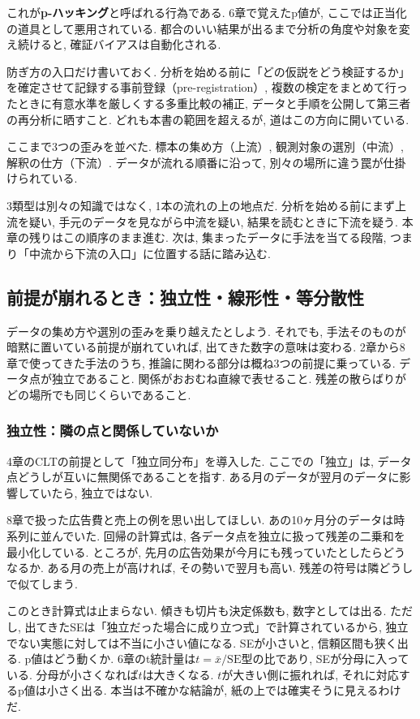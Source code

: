 これが\textbf{p-ハッキング}と呼ばれる行為である.
6章で覚えたp値が, ここでは正当化の道具として悪用されている.
都合のいい結果が出るまで分析の角度や対象を変え続けると, 確証バイアスは自動化される.

防ぎ方の入口だけ書いておく.
分析を始める前に「どの仮説をどう検証するか」を確定させて記録する事前登録（pre-registration）, 複数の検定をまとめて行ったときに有意水準を厳しくする多重比較の補正, データと手順を公開して第三者の再分析に晒すこと.
どれも本書の範囲を超えるが, 道はこの方向に開いている.

ここまで3つの歪みを並べた.
標本の集め方（上流）, 観測対象の選別（中流）, 解釈の仕方（下流）.
データが流れる順番に沿って, 別々の場所に違う罠が仕掛けられている.

3類型は別々の知識ではなく, 1本の流れの上の地点だ.
分析を始める前にまず上流を疑い, 手元のデータを見ながら中流を疑い, 結果を読むときに下流を疑う.
本章の残りはこの順序のまま進む.
次は, 集まったデータに手法を当てる段階, つまり「中流から下流の入口」に位置する話に踏み込む.


\subsection{前提が崩れるとき：独立性・線形性・等分散性}

データの集め方や選別の歪みを乗り越えたとしよう.
それでも, 手法そのものが暗黙に置いている前提が崩れていれば, 出てきた数字の意味は変わる.
2章から8章で使ってきた手法のうち, 推論に関わる部分は概ね3つの前提に乗っている.
データ点が独立であること. 関係がおおむね直線で表せること. 残差の散らばりがどの場所でも同じくらいであること.

\subsubsection*{独立性：隣の点と関係していないか}

4章のCLTの前提として「独立同分布」を導入した.
ここでの「独立」は, データ点どうしが互いに無関係であることを指す.
ある月のデータが翌月のデータに影響していたら, 独立ではない.

8章で扱った広告費と売上の例を思い出してほしい.
あの10ヶ月分のデータは時系列に並んでいた.
回帰の計算式は, 各データ点を独立に扱って残差の二乗和を最小化している.
ところが, 先月の広告効果が今月にも残っていたとしたらどうなるか.
ある月の売上が高ければ, その勢いで翌月も高い. 残差の符号は隣どうしで似てしまう.

このとき計算式は止まらない. 傾きも切片も決定係数も, 数字としては出る.
ただし, 出てきたSEは「独立だった場合に成り立つ式」で計算されているから, 独立でない実態に対しては不当に小さい値になる.
SEが小さいと, 信頼区間も狭く出る.
p値はどう動くか. 6章のt統計量は$t = \bar{x}/\mathrm{SE}$型の比であり, SEが分母に入っている.
分母が小さくなれば$t$は大きくなる. $t$が大きい側に振れれば, それに対応するp値は小さく出る.
本当は不確かな結論が, 紙の上では確実そうに見えるわけだ.

